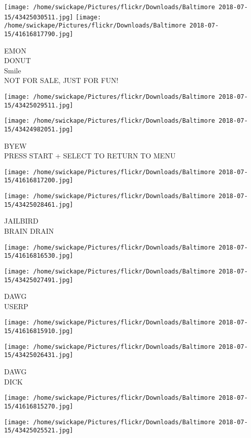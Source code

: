 \documentclass[10pt,letterpaper]{article}
\begin{document}
\texttt{[image: /home/swickape/Pictures/flickr/Downloads/Baltimore 2018-07-15/43425030511.jpg]}
\texttt{[image: /home/swickape/Pictures/flickr/Downloads/Baltimore 2018-07-15/41616817790.jpg]}

EMON\\
DONUT\\
Smile\\
NOT FOR SALE, JUST FOR FUN!
\pagebreak

\texttt{[image: /home/swickape/Pictures/flickr/Downloads/Baltimore 2018-07-15/43425029511.jpg]}

\vspace{0.25in}
\texttt{[image: /home/swickape/Pictures/flickr/Downloads/Baltimore 2018-07-15/43424982051.jpg]}

BYEW\\
PRESS START + SELECT TO RETURN TO MENU
\pagebreak

\texttt{[image: /home/swickape/Pictures/flickr/Downloads/Baltimore 2018-07-15/41616817200.jpg]}

\vspace{0.25in}
\texttt{[image: /home/swickape/Pictures/flickr/Downloads/Baltimore 2018-07-15/43425028461.jpg]}

JAILBIRD\\
BRAIN DRAIN
\pagebreak

\texttt{[image: /home/swickape/Pictures/flickr/Downloads/Baltimore 2018-07-15/41616816530.jpg]}

\vspace{0.25in}
\texttt{[image: /home/swickape/Pictures/flickr/Downloads/Baltimore 2018-07-15/43425027491.jpg]}

DAWG\\
USERP
\pagebreak

\texttt{[image: /home/swickape/Pictures/flickr/Downloads/Baltimore 2018-07-15/41616815910.jpg]}

\vspace{0.25in}
\texttt{[image: /home/swickape/Pictures/flickr/Downloads/Baltimore 2018-07-15/43425026431.jpg]}

DAWG\\
DICK
\pagebreak

\texttt{[image: /home/swickape/Pictures/flickr/Downloads/Baltimore 2018-07-15/41616815270.jpg]}

\vspace{0.25in}
\texttt{[image: /home/swickape/Pictures/flickr/Downloads/Baltimore 2018-07-15/43425025521.jpg]}
\end{document}
